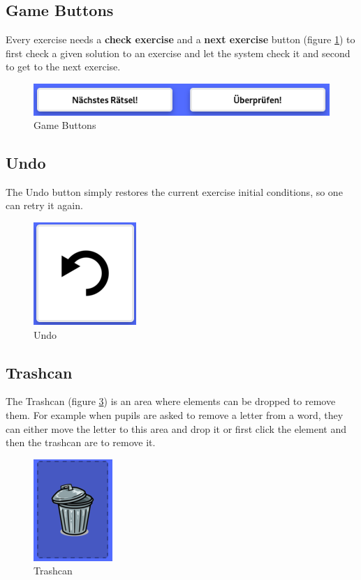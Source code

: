 \subsection*{Game Buttons}
Every exercise needs a \textbf{check exercise} and a \textbf{next exercise} button (figure \ref{fig:gameButtons}) to first check a given solution to an exercise and let the system check it and second to get to the next exercise.

\begin{figure} 
    \centering
    \includegraphics[width=0.6 \columnwidth]{figures/game_buttons.png}
    \caption{Game Buttons} 
    \label{fig:gameButtons} 
\end{figure}

\subsection*{Undo}
The Undo button simply restores the current exercise initial conditions, so one can retry it again.

\begin{figure} 
    \centering
    \includegraphics[width=0.1 \columnwidth]{figures/undo.png}
    \caption{Undo} 
    \label{fig:undo} 
\end{figure}

\subsection*{Trashcan}
The Trashcan (figure \ref{fig:trashcan}) is an area where elements can be dropped to remove them. For example when pupils are asked to remove a letter from a word, they can either move the letter to this area and drop it or first click the element and then the trashcan are to remove it.

\begin{figure} 
    \centering
    \includegraphics[width=0.1 \columnwidth]{figures/trashcan.png}
    \caption{Trashcan} 
    \label{fig:trashcan} 
\end{figure}


